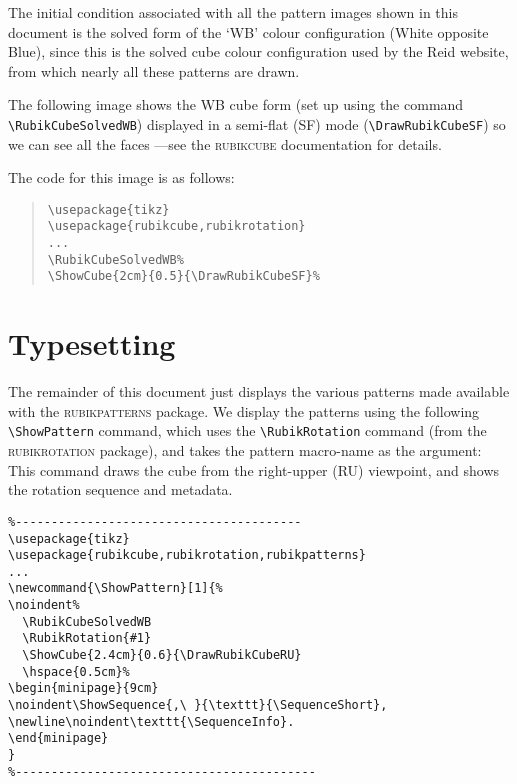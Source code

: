 \documentclass[a4paper]{article}
\newcommand{\ShowPattern}[1]{%
\noindent%
  \RubikCubeSolvedWB
  \RubikRotation{#1}
  \ShowCube{2.4cm}{0.6}{\DrawRubikCubeRU}
  \hspace{0.5cm}%
\begin{minipage}{9cm}
\noindent\ShowSequence{,\ }{\texttt}{\SequenceShort},
\newline\noindent\texttt{\SequenceInfo}.
\end{minipage}
}
\begin{document}
The initial condition   associated with all the pattern images shown in this 
document is the  solved form of the `WB' colour configuration 
(White opposite Blue), since this is the solved cube colour configuration used 
by the Reid website, from which nearly all these patterns are drawn.


The following image shows the WB cube form (set up using the command 
\verb!\RubikCubeSolvedWB!) displayed in a  semi-flat (SF) mode 
(\verb!\DrawRubikCubeSF!) so we can see all the faces 
---see the \textsc{rubikcube} documentation for details.

\bigskip

  \RubikCubeSolvedWB%

\medskip
{\noindent}The code for this image is as follows:

\begin{quote}
\begin{verbatim}
\usepackage{tikz}
\usepackage{rubikcube,rubikrotation} 
...
\RubikCubeSolvedWB%
\ShowCube{2cm}{0.5}{\DrawRubikCubeSF}%
\end{verbatim}
\end{quote}





\section{Typesetting}

The remainder of this document just  displays the various patterns made available 
 with the \textsc{rubikpatterns} package. 
We display the patterns using the following   \verb!\ShowPattern! command, which
uses the  \verb!\RubikRotation! command (from the  \textsc{rubikrotation} package),
and  takes the pattern macro-name as the argument:
This command draws the cube from the right-upper (RU) viewpoint, and shows the 
rotation sequence and metadata.

\begin{verbatim}
%----------------------------------------
\usepackage{tikz}
\usepackage{rubikcube,rubikrotation,rubikpatterns} 
...
\newcommand{\ShowPattern}[1]{%
\noindent%
  \RubikCubeSolvedWB
  \RubikRotation{#1}
  \ShowCube{2.4cm}{0.6}{\DrawRubikCubeRU}
  \hspace{0.5cm}%
\begin{minipage}{9cm}
\noindent\ShowSequence{,\ }{\texttt}{\SequenceShort},
\newline\noindent\texttt{\SequenceInfo}.
\end{minipage}
}
%------------------------------------------
\end{verbatim}
\end{document}
